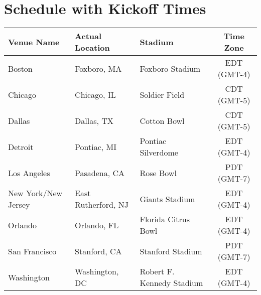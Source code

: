 \chapter{Schedule with Kickoff Times}
\newline
\newline
\small
\begin{tabular} { l l l c }
Venue Name & Actual Location & Stadium & Time Zone \\ \hline
Boston & Foxboro, MA & Foxboro Stadium & EDT (GMT-4) \\
Chicago & Chicago, IL & Soldier Field & CDT (GMT-5) \\
Dallas & Dallas, TX & Cotton Bowl & CDT (GMT-5) \\
Detroit & Pontiac, MI & Pontiac Silverdome & EDT (GMT-4) \\
Los Angeles & Pasadena, CA & Rose Bowl & PDT (GMT-7) \\
New York/New Jersey & East Rutherford, NJ & Giants Stadium & EDT (GMT-4) \\
Orlando & Orlando, FL & Florida Citrus Bowl & EDT (GMT-4) \\
San Francisco & Stanford, CA & Stanford Stadium & PDT (GMT-7) \\
Washington & Washington, DC & Robert F. Kennedy Stadium & EDT (GMT-4) \\ \hline
\end{tabular}
\normalsize
